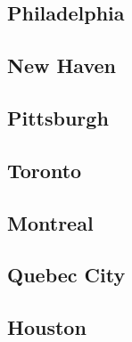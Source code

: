 \documentclass{article}
\begin{document}
    \subsection{Philadelphia}
    \begin{outline}

    \end{outline}
    \subsection{New Haven}
    \begin{outline}

    \end{outline}
    \subsection{Pittsburgh}
    \begin{outline}

    \end{outline}
    \subsection{Toronto}
    \begin{outline}

    \end{outline}
    \subsection{Montreal}
    \begin{outline}

    \end{outline}
    \subsection{Quebec City}
    \begin{outline}

    \end{outline}
    \subsection{Houston}
    \begin{outline}

    \end{outline}
\end{document}
